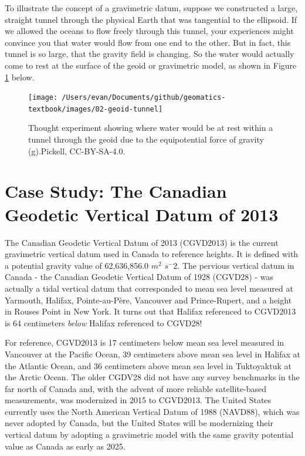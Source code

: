 \documentclass[
]{book}
\begin{document}
To illustrate the concept of a gravimetric datum, suppose we constructed a large, straight tunnel through the physical Earth that was tangential to the ellipsoid. If we allowed the oceans to flow freely through this tunnel, your experiences might convince you that water would flow from one end to the other. But in fact, this tunnel is so large, that the gravity field is changing. So the water would actually come to rest at the surface of the geoid or gravimetric model, as shown in Figure \ref{fig:2-geoid-tunnel} below.

\begin{figure}
\texttt{[image: /Users/evan/Documents/github/geomatics-textbook/images/02-geoid-tunnel]} \caption{Thought experiment showing where water would be at rest within a tunnel through the geoid due to the equipotential force of gravity (g).Pickell, CC-BY-SA-4.0.}\label{fig:2-geoid-tunnel}
\end{figure}

\hypertarget{case-study-the-canadian-geodetic-vertical-datum-of-2013}{%
\section{Case Study: The Canadian Geodetic Vertical Datum of 2013}\label{case-study-the-canadian-geodetic-vertical-datum-of-2013}}

The Canadian Geodetic Vertical Datum of 2013 (CGVD2013) is the current gravimetric vertical datum used in Canada to reference heights. It is defined with a potential gravity value of 62,636,856.0 \(m^2\) \(s^-2\). The pervious vertical datum in Canada - the Canadian Geodetic Vertical Datum of 1928 (CGVD28) - was actually a tidal vertical datum that corresponded to mean sea level measured at Yarmouth, Halifax, Pointe-au-Père, Vancouver and Prince-Rupert, and a height in Rouses Point in New York. It turns out that Halifax referenced to CGVD2013 is 64 centimeters \emph{below} Halifax referenced to CGVD28!

For reference, CGVD2013 is 17 centimeters below mean sea level measured in Vancouver at the Pacific Ocean, 39 centimeters above mean sea level in Halifax at the Atlantic Ocean, and 36 centimeters above mean sea level in Tuktoyaktuk at the Arctic Ocean. The older CGDV28 did not have any survey benchmarks in the far north of Canada and, with the advent of more reliable satellite-based measurements, was modernized in 2015 to CGVD2013. The United States currently uses the North American Vertical Datum of 1988 (NAVD88), which was never adopted by Canada, but the United States will be modernizing their vertical datum by adopting a gravimetric model with the same gravity potential value as Canada as early as 2025.
\end{document}
